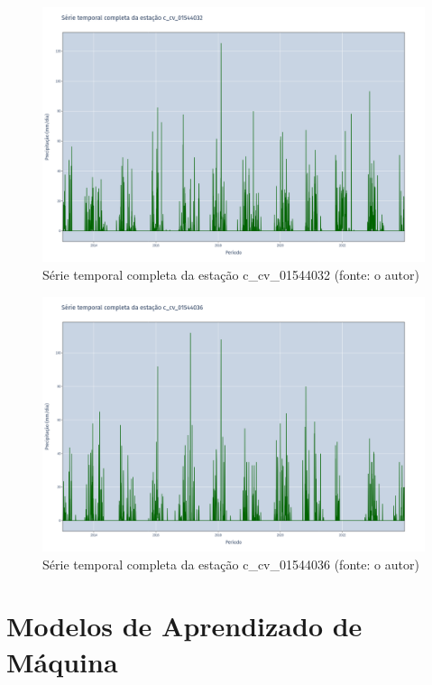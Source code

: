 \begin{figure}[!h]
\centering
\includegraphics[scale=0.25]{Figuras/rio_sao_francisco/franciscoSerieCompleta_c_cv_01544032.png}
\caption{Série temporal completa da estação c\_cv\_01544032 (fonte: o autor)}
\label{fig:franciscoSerieCompleta_c_cv_01544032}
\end{figure}

\begin{figure}[!h]
\centering
\includegraphics[scale=0.25]{Figuras/rio_sao_francisco/franciscoSerieCompleta_c_cv_01544036.png}
\caption{Série temporal completa da estação c\_cv\_01544036 (fonte: o autor)}
\label{fig:franciscoSerieCompleta_c_cv_01544036}
\end{figure}


\section{Modelos de Aprendizado de Máquina}




